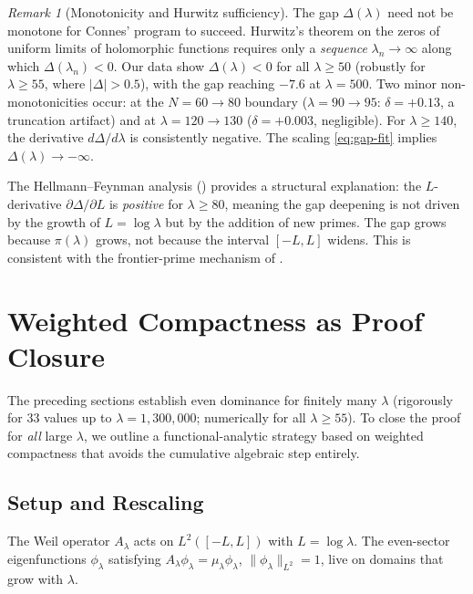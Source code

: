 \documentclass[12pt,a4paper]{article}
\theoremstyle{definition}
\theoremstyle{remark}
\newtheorem{remark}[theorem]{Remark}
\begin{document}
\begin{remark}[Monotonicity and Hurwitz sufficiency]
\label{rem:hurwitz}
The gap $\Delta(\lambda)$ need not be monotone for Connes' program to succeed. Hurwitz's theorem on the zeros of uniform limits of holomorphic functions requires only a \emph{sequence} $\lambda_n \to \infty$ along which $\Delta(\lambda_n) < 0$. Our data show $\Delta(\lambda) < 0$ for all $\lambda \geq 50$ (robustly for $\lambda \geq 55$, where $|\Delta| > 0.5$), with the gap reaching $-7.6$ at $\lambda = 500$. Two minor non-monotonicities occur: at the $N = 60 \to 80$ boundary ($\lambda = 90 \to 95$: $\delta = +0.13$, a truncation artifact) and at $\lambda = 120 \to 130$ ($\delta = +0.003$, negligible). For $\lambda \geq 140$, the derivative $d\Delta/d\lambda$ is consistently negative. The scaling \eqref{eq:gap-fit} implies $\Delta(\lambda) \to -\infty$.

The Hellmann--Feynman analysis () provides a structural explanation: the $L$-derivative $\partial\Delta/\partial L$ is \emph{positive} for $\lambda \geq 80$, meaning the gap deepening is not driven by the growth of $L = \log\lambda$ but by the addition of new primes. The gap grows because $\pi(\lambda)$ grows, not because the interval $[-L, L]$ widens. This is consistent with the frontier-prime mechanism of .
\end{remark}


\section{Weighted Compactness as Proof Closure}
\label{sec:weighted-compactness}

The preceding sections establish even dominance for finitely many $\lambda$ (rigorously for $33$ values up to $\lambda = 1{,}300{,}000$; numerically for all $\lambda \geq 55$). To close the proof for \emph{all} large $\lambda$, we outline a functional-analytic strategy based on weighted compactness that avoids the cumulative algebraic step entirely.

\subsection{Setup and Rescaling}

The Weil operator $A_\lambda$ acts on $L^2([-L, L])$ with $L = \log\lambda$. The even-sector eigenfunctions $\phi_\lambda$ satisfying $A_\lambda \phi_\lambda = \mu_\lambda \phi_\lambda$, $\|\phi_\lambda\|_{L^2} = 1$, live on domains that grow with $\lambda$.
\end{document}
